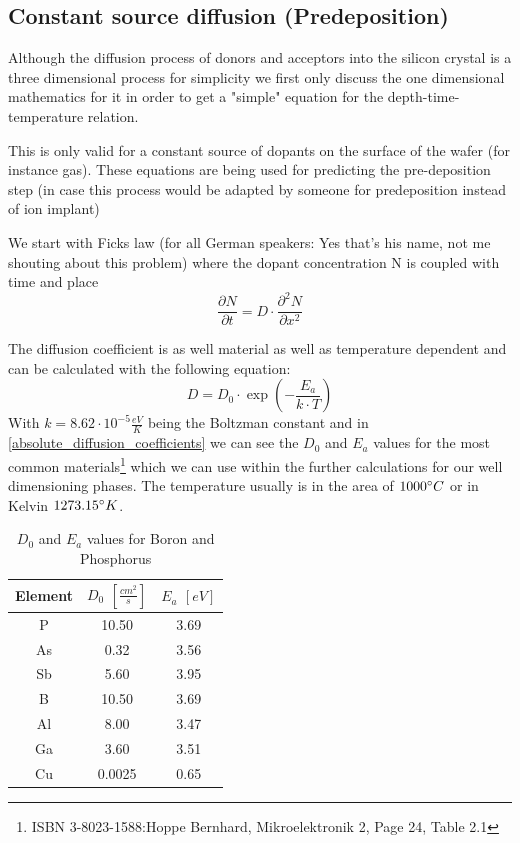 \subsection{Constant source diffusion (Predeposition)}

Although the diffusion process of donors and acceptors into the silicon crystal is a three dimensional process for simplicity we first only discuss the one dimensional mathematics for it in order to get a "simple" equation for the depth-time-temperature relation.

\begin{mdframed}[linewidth=2pt,linecolor=red]
This is only valid for a constant source of dopants on the surface of the wafer (for instance gas).
These equations are being used for predicting the pre-deposition step (in case this process would be adapted by someone for predeposition instead of ion implant)
\end{mdframed}

We start with Ficks law (for all German speakers: Yes that's his name, not me shouting about this problem) where the dopant concentration N is coupled with time and place
\begin{equation}
\frac{\partial N}{\partial t} = D \cdot \frac{\partial^2 N}{\partial x^2}
\end{equation}

The diffusion coefficient is as well material as well as temperature dependent  and can be calculated with the following equation:
\begin{equation}
D = D_0 \cdot \exp\left(-\frac{E_a}{k \cdot T}\right)
\end{equation}
With $k=8.62 \cdot 10^{-5} \frac{eV}{K}$ being the Boltzman constant and in \autoref{absolute_diffusion_coefficients} we can see the $D_0$ and $E_a$ values for the most common materials\footnote{ISBN 3-8023-1588:Hoppe Bernhard, Mikroelektronik 2, Page 24, Table 2.1} which we can use within the further calculations for our well dimensioning phases. The temperature usually is in the area of $1000\degree C$ or in Kelvin $1273.15\degree K$.
\begin{table}[H]
	\centering
	\begin{tabular}{|c|c|c|}
		\hline
		Element &
		$D_0$ $\left[\frac{cm^2}{s}\right]$ &
		$E_a$ $\left[eV\right]$ \\
		\hline
		P &
		10.50 &
		3.69 \\
		\hline
		As &
		0.32 &
		3.56 \\
		\hline
		Sb &
		5.60 &
		3.95 \\
		\hline
		B &
		10.50 &
		3.69 \\
		\hline
		Al &
		8.00 &
		3.47 \\
		\hline
		Ga &
		3.60 &
		3.51 \\
		\hline
		Cu &
		0.0025 &
		0.65 \\
		\hline
	\end{tabular}
	\label{absolute_diffusion_coefficients}
	\caption{$D_0$ and $E_a$ values for Boron and Phosphorus}
\end{table}

